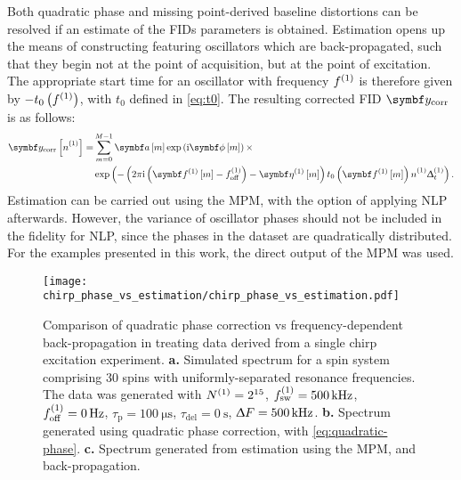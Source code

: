 Both quadratic phase and missing point-derived baseline distortions can be
resolved if an estimate of the \acp{FID} parameters is obtained. Estimation
opens up the means of constructing  featuring oscillators which
are back-propagated, such that they begin not at the point of acquisition, but
at the point of excitation. The appropriate start time for an oscillator with
frequency $f^{(1)}$ is therefore given by $-t_0\left( f^{(1)} \right)$, with  $t_0$
defined in \eqref{eq:t0}. The resulting corrected \ac{FID} $\by_{\text{corr}}$
is as follows:
\begin{equation}
    \begin{split}
        \by_{\text{corr}} \left[ \none \right] =
            &\sum_{m=0}^{M-1} \bdam \exp \left( \iu \bdphim \right) \times \\
            &\exp\left(-
            \left(2 \pi \iu \left(\bdfonem - \foffone \right) - \bdetaonem \right)
            t_0 \left(\bdfonem\right) \none \Dtone
            \right).
    \end{split}
\end{equation}
Estimation can be carried out using the \ac{MPM}, with the option of applying
\ac{NLP} afterwards. However, the variance of oscillator phases should not be
included in the fidelity for \ac{NLP}, since the phases in the dataset are
quadratically distributed. For the examples presented in this work, the direct
output of the \ac{MPM} was used.

\begin{figure}
    \centering
    \texttt{[image: chirp\_phase\_vs\_estimation/chirp\_phase\_vs\_estimation.pdf]}
    \caption[
        Comparison of quadratic phase correction vs frequency-dependent
        back-propagation in treating data derived from a single-chirp
        excitation experiment.
    ]
    {
        Comparison of quadratic phase correction vs frequency-dependent
        back-propagation in treating data derived from a single chirp
        excitation experiment.
        \textbf{a.} Simulated spectrum for a spin system comprising 30 spins
        with uniformly-separated resonance frequencies. The data was generated
        with
        $N^{(1)}=2^{15}$,
        $f_{\mathrm{sw}}^{(1)}=\qty{500}{\kilo\hertz}$,
        $f_{\mathrm{off}}^{(1)}=\qty{0}{\hertz}$,
        $\tau_{\text{p}} = \qty{100}{\micro\second}$,
        $\tau_{\text{del}} = \qty{0}{\second}$,
        $\Updelta F = \qty{500}{\kilo\hertz}$.
        \textbf{b.} Spectrum generated using quadratic phase correction, with
        \eqref{eq:quadratic-phase}.
        \textbf{c.} Spectrum generated from estimation using the \ac{MPM}, and
        back-propagation.
    }
    \label{fig:chirp-phase-vs-backprop}
\end{figure}
